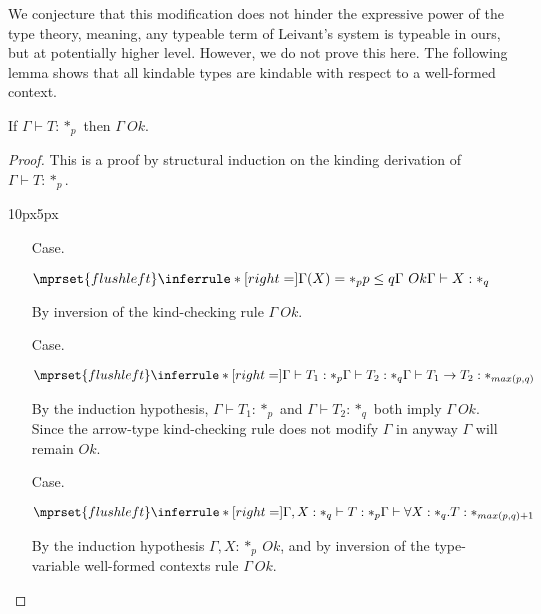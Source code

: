 We conjecture that this modification does not hinder the expressive
power of the type theory, meaning, any typeable term of Leivant's
system is typeable in ours, but at potentially higher level.  However,
we do not prove this here.  The following lemma shows that all
kindable types are kindable with respect to a well-formed context.
\begin{lemma}
  If $\Gamma \vdash T:*_p$ then $\Gamma\ Ok$.
  \label{lemma:kinding_ok_ssf}
\end{lemma}
\begin{proof}
  This is a proof by structural induction on the kinding derivation of
  $\Gamma \vdash T:*_p$.
  \vspace{-25px}
  \begin{changemargin}{10px}{5px}\noindent
  \begin{itemize}
  \item[Case.]\ \\
    \begin{center}
      \begin{math}
        $$\mprset{flushleft}
        \inferrule* [right=] {
          \Gamma(X) = *_p
          \\
          p \leq q
          \\
          \Gamma\ Ok
        }{\Gamma \vdash X : *_q}
      \end{math}
    \end{center}
    By inversion of the kind-checking rule $\Gamma\ Ok$.

  \item[Case.]\ \\
    \begin{center}
      \begin{math}
        $$\mprset{flushleft}
        \inferrule* [right=] {
          \Gamma \vdash T_1 : *_p
          \\
          \Gamma \vdash T_2 : *_q
        }{\Gamma \vdash T_1 \rightarrow T_2 : *_{max(p,q)}}
      \end{math}
    \end{center}
    By the induction hypothesis, $\Gamma \vdash T_1:*_p$ and
    $\Gamma \vdash T_2:*_q$ both imply $\Gamma\ Ok$.  Since the
    arrow-type kind-checking rule does not modify $\Gamma$ in anyway
    $\Gamma$ will remain $Ok$.

  \item[Case.]\ \\
    \begin{center}
      \begin{math}
        $$\mprset{flushleft}
        \inferrule* [right=] {
          \Gamma,X : *_q \vdash T : *_p
        }{\Gamma \vdash \forall X:*_q.T : *_{max(p,q)+1}}
      \end{math}
    \end{center}
    By the induction hypothesis $\Gamma,X:*_p\ Ok$, and by inversion of the type-variable
    well-formed contexts rule $\Gamma\ Ok$.
  \end{itemize}
  \end{changemargin}
\end{proof}
